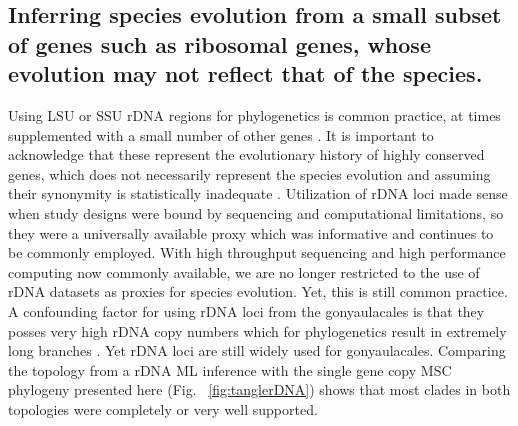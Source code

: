 \documentclass[12pt]{article}
\begin{document}
\subsection*{Inferring species evolution from a small subset of genes such as ribosomal genes, whose evolution may not reflect that of the species.}
\FloatBarrier 
Using LSU or SSU rDNA regions for phylogenetics is common practice, at times supplemented with a small number of other genes \cite{shalchian2006combined,zhang2007three,saldarriaga2004molecular,murray2005improving,hoppenrath2010dinoflagellate}. 
It is important to acknowledge that these represent the evolutionary history of highly conserved genes, which does not necessarily represent the species evolution and assuming their synonymity is statistically inadequate \cite{degnan2009gene}.
Utilization of rDNA loci made sense when study designs were bound by sequencing and computational limitations, so they were a universally available proxy which was informative and continues to be commonly employed. 
With high throughput sequencing and high performance computing now commonly available, we are no longer restricted to the use of rDNA datasets as proxies for species evolution. 
Yet, this is still common practice. 
A confounding factor for using rDNA loci from the gonyaulacales is that they posses very high rDNA copy numbers which for phylogenetics result in extremely long branches \cite{he2016reducing}. 
Yet rDNA loci are still widely used for gonyaulacales. 
Comparing the topology from a rDNA ML inference with the single gene copy MSC phylogeny presented here (Fig. ~\ref{fig:tanglerDNA}) shows that most clades in both topologies were completely or very well supported. 
\end{document}
